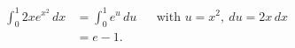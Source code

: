 \documentclass{article}
\begin{document}
\begin{align*}
  \int_0^1 2x e^{x^2}\,dx
    &= \int_0^1 e^u\,du
      && \text{with }u=x^2,\ du=2x\,dx \\
    &= e-1.
\end{align*}
\end{document}
